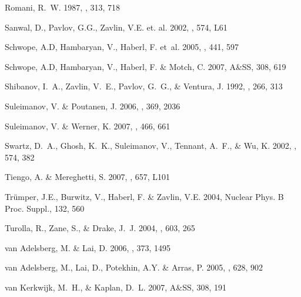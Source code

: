 \documentclass{aa}
\begin{document}
\begin{thebibliography}{}
{Romani}, R.~W. 1987, \apj, 313, 718 
 
{Sanwal}, D., {Pavlov}, G.G., {Zavlin}, V.E. et. al. 
2002, \apj, 574, L61 
 
{Schwope}, A.D, {Hambaryan}, V., {Haberl}, F.  {et~al.} 
2005,  \aap, 441, 597 
 
{Schwope}, A.D, {Hambaryan}, V., {Haberl}, F. \& {Motch}, C. 
2007,  A\&SS, 308, 619 
 
{Shibanov}, I.~A., {Zavlin}, V.~E., {Pavlov}, G.~G., \& {Ventura}, J. 1992, 
  \aap, 266, 313 
 
{Suleimanov}, V. \& {Poutanen}, J. 2006, \mnras, 369, 2036 
 
{Suleimanov}, V. \& {Werner}, K. 
  2007, \aap, 466, 661 
 
{Swartz}, D.~A., {Ghosh}, K.~K., {Suleimanov}, V., {Tennant}, A.~F., \& {Wu}, 
  K. 2002, \apj, 574, 382 
 
{Tiengo}, A. \& {Mereghetti}, S. 2007, \apj, 657, L101 
 
 {Tr\"umper}, J.E., {Burwitz}, V., {Haberl}, F. \& {Zavlin}, V.E.  2004, 
Nuclear Phys. B Proc. Suppl., 132, 560 
 
{Turolla}, R., {Zane}, S., \& 
{Drake}, J.~J. 2004, 
\apj, 603, 265 
 
{van Adelsberg}, M. \& {Lai}, D. 
 2006,  \mnras, 373, 1495 
 
{van Adelsberg}, M., {Lai}, D., {Potekhin}, A.Y. \& {Arras}, P. 
 2005,  \apj, 628, 902 
 
{van Kerkwijk}, M.~H., \& {Kaplan}, D.~L. 
 2007,  A\&SS, 308, 191 
 

\end{thebibliography}
\end{document}
